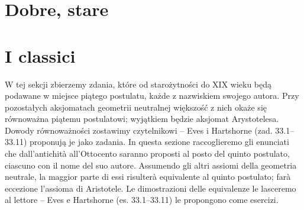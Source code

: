
\section{Dobre, stare} %
\section{I classici} %
\label{sekcja_dobre_stare}

W tej sekcji zbierzemy zdania, które od starożytności do XIX wieku będą podawane w miejsce piątego postulatu, każde z nazwiskiem swojego autora. %
Przy pozostałych aksjomatach geometrii neutralnej większość z nich okaże się równoważna piątemu postulatowi; wyjątkiem będzie aksjomat Arystotelesa. %
Dowody równoważności zostawimy czytelnikowi -- Eves \cite[s. 284, 288, 291]{eves1_1972} i Hartshorne \cite[s. 301--303]{hartshorne_2000} (zad. 33.1--33.11) proponują je jako zadania. %
In questa sezione raccoglieremo gli enunciati che dall'antichità all'Ottocento saranno proposti al posto del quinto postulato, ciascuno con il nome del suo autore. %
Assumendo gli altri assiomi della geometria neutrale, la maggior parte di essi risulterà equivalente al quinto postulato; farà eccezione l'assioma di Aristotele. %
Le dimostrazioni delle equivalenze le lasceremo al lettore -- Eves \cite[p. 284, 288, 291]{eves1_1972} e Hartshorne \cite[p. 301--303]{hartshorne_2000} (es. 33.1--33.11) le propongono come esercizi. %

